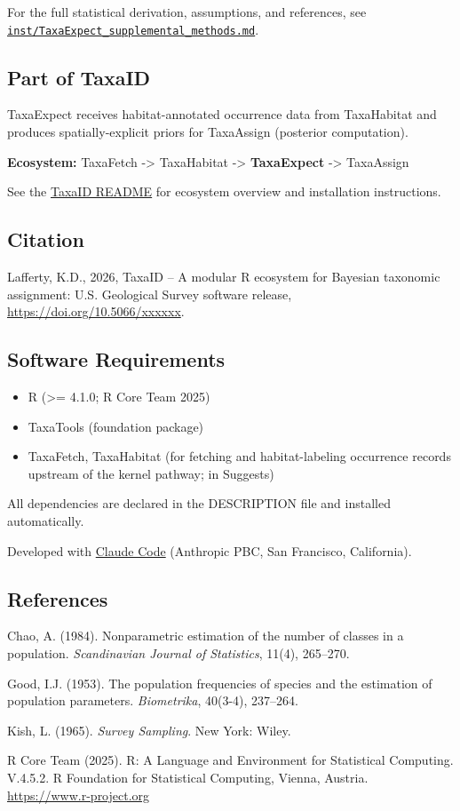 \documentclass[
]{article}
\providecommand{\tightlist}{%
  \setlength{\itemsep}{0pt}\setlength{\parskip}{0pt}}
\begin{document}
For the full statistical derivation, assumptions, and references, see
\href{inst/TaxaExpect_supplemental_methods.md}{\texttt{inst/TaxaExpect\_supplemental\_methods.md}}.

\subsection{Part of TaxaID}\label{part-of-taxaid}

TaxaExpect receives habitat-annotated occurrence data from TaxaHabitat
and produces spatially-explicit priors for TaxaAssign (posterior
computation).

\textbf{Ecosystem:} TaxaFetch -\textgreater{} TaxaHabitat
-\textgreater{} \textbf{TaxaExpect} -\textgreater{} TaxaAssign

See the \href{https://github.com/DOI-USGS/TaxaID}{TaxaID README} for
ecosystem overview and installation instructions.

\subsection{Citation}\label{citation}

Lafferty, K.D., 2026, TaxaID -- A modular R ecosystem for Bayesian
taxonomic assignment: U.S. Geological Survey software release,
\url{https://doi.org/10.5066/xxxxxx}.

\subsection{Software Requirements}\label{software-requirements}

\begin{itemize}
\tightlist
\item
  R (\textgreater= 4.1.0; R Core Team 2025)
\item
  TaxaTools (foundation package)
\item
  TaxaFetch, TaxaHabitat (for fetching and habitat-labeling occurrence
  records upstream of the kernel pathway; in Suggests)
\end{itemize}

All dependencies are declared in the DESCRIPTION file and installed
automatically.

Developed with \href{https://claude.ai/code}{Claude Code} (Anthropic
PBC, San Francisco, California).

\subsection{References}\label{references}

Chao, A. (1984). Nonparametric estimation of the number of classes in a
population. \emph{Scandinavian Journal of Statistics}, 11(4), 265--270.

Good, I.J. (1953). The population frequencies of species and the
estimation of population parameters. \emph{Biometrika}, 40(3-4),
237--264.

Kish, L. (1965). \emph{Survey Sampling}. New York: Wiley.

R Core Team (2025). R: A Language and Environment for Statistical
Computing. V.4.5.2. R Foundation for Statistical Computing, Vienna,
Austria. \url{https://www.r-project.org}
\end{document}
